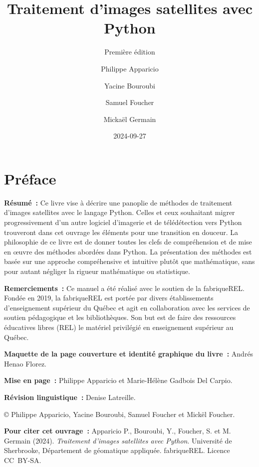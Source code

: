 \documentclass[
  letterpaper,
  DIV=11,
  numbers=noendperiod]{scrreprt}
\title{Traitement d'images satellites avec Python}
\subtitle{Première édition}
\author{Philippe Apparicio \and Yacine Bouroubi \and Samuel
Foucher \and Mickaël Germain}
\date{2024-09-27}
\renewcommand*\contentsname{Table des matières}
\newcommand\contentsname{Table des matières}
\begin{document}
\maketitle

\renewcommand*\contentsname{Table des matières}
{
\hypersetup{linkcolor=}
\setcounter{tocdepth}{2}
\tableofcontents
}


\chapter*{Préface}\label{pruxe9face}


\renewcommand{\partname}{} %

\textbf{Résumé~:} Ce livre vise à décrire une panoplie de méthodes de
traitement d'images satellites avec le langage Python. Celles et ceux
souhaitant migrer progressivement d'un autre logiciel d'imagerie et de
télédétection vers Python trouveront dans cet ouvrage les éléments pour
une transition en douceur. La philosophie de ce livre est de donner
toutes les clefs de compréhension et de mise en œuvre des méthodes
abordées dans Python. La présentation des méthodes est basée sur une
approche compréhensive et intuitive plutôt que mathématique, sans pour
autant négliger la rigueur mathématique ou statistique.

\textbf{Remerciements~:} Ce manuel a été réalisé avec le soutien de la
fabriqueREL. Fondée en 2019, la fabriqueREL est portée par divers
établissements d'enseignement supérieur du Québec et agit en
collaboration avec les services de soutien pédagogique et les
bibliothèques. Son but est de faire des ressources éducatives libres
(REL) le matériel privilégié en enseignement supérieur au Québec.

\textbf{Maquette de la page couverture et identité graphique du livre~:}
Andrés Henao Florez.

\textbf{Mise en page~:} Philippe Apparicio et Marie-Hélène Gadbois Del
Carpio.

\textbf{Révision linguistique~:} Denise Latreille.

© Philippe Apparicio, Yacine Bouroubi, Samuel Foucher et Mickël Foucher.

\textbf{Pour citer cet ouvrage~:} Apparicio P., Bouroubi, Y., Foucher,
S. et M. Germain (2024). \emph{Traitement d'images satellites avec
Python}. Université de Sherbrooke, Département de géomatique appliquée.
fabriqueREL. Licence CC~BY-SA.
\end{document}
